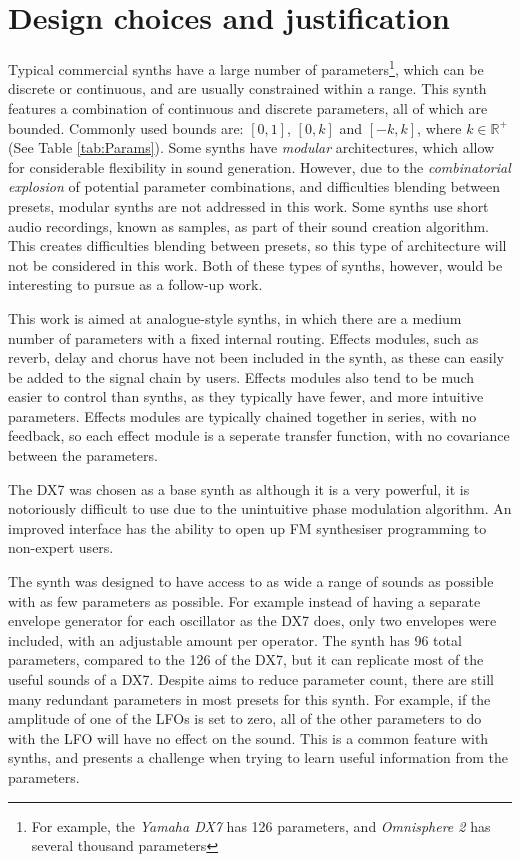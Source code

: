 \documentclass[11pt, oneside]{report}   	%
\begin{document}
\section{Design choices and justification}\label{sec:SynthDescription}
Typical commercial synths have a large number of parameters\footnote{For example, the \emph{Yamaha DX7} has 126 parameters, and  \emph{Omnisphere 2} has several thousand parameters}, which can be discrete or continuous, and are usually constrained within a range. This synth features a combination of continuous and discrete parameters, all of which are bounded. Commonly used bounds are: $[0, 1]$, $[0, k]$ and $[-k, k]$, where $k \in \mathbb{R}^+ $ (See Table \ref{tab:Params}). 
Some synths have \emph{modular} architectures, which allow for considerable flexibility in sound generation. However, due to the \emph{combinatorial explosion} of potential parameter combinations, and difficulties blending between presets, modular synths are not addressed in this work.
Some synths use short audio recordings, known as samples, as part of their sound creation algorithm. This creates difficulties blending between presets, so this type of architecture will not be considered in this work. Both of these types of synths, however, would be interesting to pursue as a follow-up work.

This work is aimed at analogue-style synths, in which there are a medium number of parameters with a fixed internal routing. Effects modules, such as reverb, delay and chorus have not been included in the synth, as these can easily be added to the signal chain by users. Effects modules also tend to be much easier to control than synths, as they typically have fewer, and more intuitive parameters. Effects modules are typically chained together in series, with no feedback, so each effect module is a seperate transfer function, with no covariance between the parameters.


The DX7 was chosen as a base synth as although it is a very powerful, it is notoriously difficult to use due to the unintuitive phase modulation algorithm. An improved interface has the ability to open up FM synthesiser programming to non-expert users. %

The synth was designed to have access to as wide a range of sounds as possible with as few parameters as possible. For example instead of having a separate envelope generator for each oscillator as the  DX7 does, only two envelopes were included, with an adjustable amount per operator. The synth has 96 total parameters, compared to the 126 of the DX7, but it can replicate most of the useful sounds of a DX7. Despite aims to reduce parameter count, there are still many redundant parameters in most presets for this synth. For example, if the amplitude of one of the LFOs is set to zero, all of the other parameters to do with the LFO will have no effect on the sound. This is a common feature with synths, and presents a challenge when trying to learn useful information from the parameters.
\end{document}
